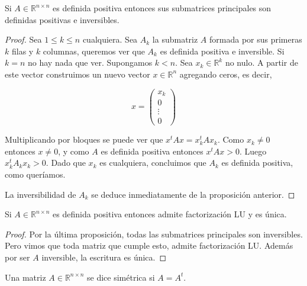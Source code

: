 \begin{propo}
\label{propo:defpos}
Si $A \in \mathbb{R}^{n \times n}$ es definida positiva entonces sus submatrices principales son definidas positivas e inversibles.

\begin{proof}
Sea $1 \leq k \leq n$ cualquiera. Sea $A_k$ la submatriz $A$ formada por sus primeras $k$ filas y $k$ columnas, queremos ver que $A_k$ es definida positiva e inversible. Si $k = n$ no hay nada que ver. Supongamos $k < n$. Sea $x_k \in \mathbb{R}^k$ no nulo. A partir de este vector construimos un nuevo vector $x \in \mathbb{R}^n$ agregando ceros, es decir,

\[x = \begin{pmatrix}
x_k\\
0 \\
\vdots \\
0
\end{pmatrix}\]

Multiplicando por bloques se puede ver que $x^t A x = x_k^t A x_k$. Como $x_k \neq 0$ entonces $x \neq 0$, y como $A$ es definida positiva entonces $x^t A x > 0$. Luego $x_k^t A_k x_k > 0$. Dado que $x_k$ es cualquiera, concluimos que $A_k$ es definida positiva, como queríamos.

La inversibilidad de $A_k$ se deduce inmediatamente de la proposición anterior.

\end{proof}
\end{propo}

\begin{coro}
Si $A \in \mathbb{R}^{n \times n}$ es definida positiva entonces admite factorización LU y es única.
\begin{proof}
Por la última proposición, todas las submatrices principales son inversibles. Pero vimos que toda matriz que cumple esto, admite factorización LU. Además por ser $A$ inversible, la escritura es única.
\end{proof}
\end{coro}

\begin{defi}
Una matriz $A \in \mathbb{R}^{n \times n}$ se dice simétrica si $A = A^t$.
\end{defi}

